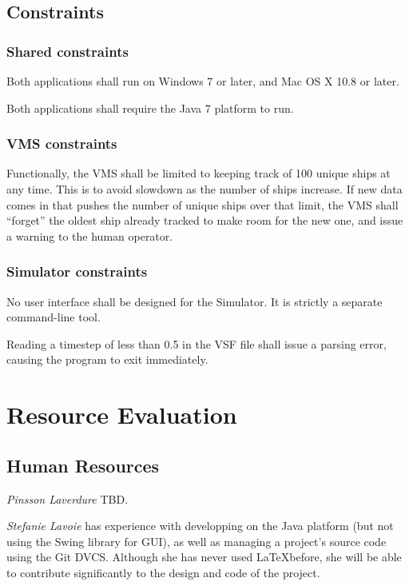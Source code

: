 \documentclass{article}
\begin{document}
\subsection{Constraints} %

\subsubsection{Shared constraints}
Both applications shall run on Windows 7 or later, and Mac OS X 10.8 or later.

Both applications shall require the Java 7 platform to run.

\subsubsection{VMS constraints}
Functionally, the VMS shall be limited to keeping track of 100 unique ships at any time. This is to avoid slowdown as the number of ships increase. If new data comes in that pushes the number of unique ships over that limit, the VMS shall ``forget'' the oldest ship already tracked to make room for the new one, and issue a warning to the human operator.

\subsubsection{Simulator constraints}

No user interface shall be designed for the Simulator. It is strictly a separate command-line tool.

Reading a timestep of less than 0.5 in the VSF file shall issue a parsing error, causing the program to exit immediately.

\section{Resource Evaluation} %

\subsection{Human Resources} %

\emph{Pinsson Laverdure} TBD.

\emph{Stefanie Lavoie} has experience with developping on the Java platform (but not using the Swing library for GUI), as well as managing a project's source code using the Git DVCS. Although she has never used \LaTeX before, she will be able to contribute significantly to the design and code of the project.
\end{document}
